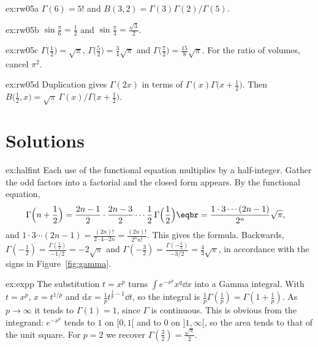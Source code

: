 \begin{hint}{ex:rw05a}
$\Gamma(6)=5!$ and $B(3,2)=\Gamma(3)\Gamma(2)/\Gamma(5)$.
\end{hint}

\begin{hint}{ex:rw05b}
$\sin\frac\pi6=\frac12$ and $\sin\frac\pi3=\frac{\sqrt3}2$.
\end{hint}

\begin{hint}{ex:rw05c}
$\Gamma\bigl(\frac12\bigr)=\sqrt\pi$, $\Gamma\bigl(\frac52\bigr)=\frac34\sqrt\pi$ and $\Gamma\bigl(\frac72\bigr)=\frac{15}8\sqrt\pi$. For the ratio of volumes, cancel $\pi^2$.
\end{hint}

\begin{hint}{ex:rw05d}
Duplication gives $\Gamma(2x)$ in terms of $\Gamma(x)\Gamma\bigl(x+\frac12\bigr)$. Then $B\bigl(\frac12,x\bigr)=\sqrt\pi\,\Gamma(x)/\Gamma\bigl(x+\frac12\bigr)$.
\end{hint}

\section{Solutions}

\begin{solution}{ex:halfint}
\idea Each use of the functional equation multiplies by a half-integer. Gather the odd factors into a factorial and the closed form appears.
\writeup By the functional equation,
\[
\begin{aligned}\Gamma\Bigl(n+\frac12\Bigr)&=\frac{2n-1}2\cdot\frac{2n-3}2\cdots\frac12\,\Gamma\Bigl(\frac12\Bigr)\eqbr=\frac{1\cdot3\cdots(2n-1)}{2^n}\sqrt\pi,\end{aligned}
\]
and
$1\cdot3\cdots(2n-1)=\frac{(2n)!}{2\cdot4\cdots2n}=\frac{(2n)!}{2^nn!}$. This gives the formula. Backwards, $\Gamma(-\frac12)=\frac{\Gamma(\frac12)}{-1/2}=-2\sqrt\pi$
and $\Gamma(-\frac32)=\frac{\Gamma(-\frac12)}{-3/2}=\frac43\sqrt\pi$, in accordance with the signs in Figure~\ref{fig:gamma}.
\end{solution}

\begin{solution}{ex:expp}
\idea The substitution $t=x^p$ turns $\int e^{-x^p}x^q\dd x$ into a Gamma integral.
\writeup With $t=x^p$, $x=t^{1/p}$ and $\mathrm dx=\frac1pt^{\frac1p-1}\dd t$, so the integral is $\frac1p\Gamma(\frac1p)=\Gamma(1+\frac1p)$. As $p\to\infty$
it tends to $\Gamma(1)=1$, since $\Gamma$ is continuous. This is obvious from the integrand: $e^{-x^p}$ tends to $1$ on $[0,1[$ and to
$0$ on $]1,\infty[$, so the area tends to that of the unit square. For $p=2$ we recover $\Gamma(\frac32)=\frac{\sqrt\pi}2$.
\end{solution}


